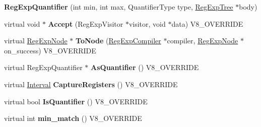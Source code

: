 \begin{DoxyCompactItemize}
\item 
\hypertarget{classv8_1_1internal_1_1_v8___f_i_n_a_l_a2d485895fb0a836c3a3dbfc3c6c30a43}{}{\bfseries Reg\+Exp\+Quantifier} (int min, int max, Quantifier\+Type type, \hyperlink{classv8_1_1internal_1_1_reg_exp_tree}{Reg\+Exp\+Tree} $\ast$body)\label{classv8_1_1internal_1_1_v8___f_i_n_a_l_a2d485895fb0a836c3a3dbfc3c6c30a43}

\item 
\hypertarget{classv8_1_1internal_1_1_v8___f_i_n_a_l_a5a421cb811caf33f244ce08fe3e5ac14}{}virtual void $\ast$ {\bfseries Accept} (Reg\+Exp\+Visitor $\ast$visitor, void $\ast$data) V8\+\_\+\+O\+V\+E\+R\+R\+I\+D\+E\label{classv8_1_1internal_1_1_v8___f_i_n_a_l_a5a421cb811caf33f244ce08fe3e5ac14}

\item 
\hypertarget{classv8_1_1internal_1_1_v8___f_i_n_a_l_aa183d4adede0c6af0c092eeebf59c194}{}virtual \hyperlink{classv8_1_1internal_1_1_reg_exp_node}{Reg\+Exp\+Node} $\ast$ {\bfseries To\+Node} (\hyperlink{classv8_1_1internal_1_1_reg_exp_compiler}{Reg\+Exp\+Compiler} $\ast$compiler, \hyperlink{classv8_1_1internal_1_1_reg_exp_node}{Reg\+Exp\+Node} $\ast$on\+\_\+success) V8\+\_\+\+O\+V\+E\+R\+R\+I\+D\+E\label{classv8_1_1internal_1_1_v8___f_i_n_a_l_aa183d4adede0c6af0c092eeebf59c194}

\item 
\hypertarget{classv8_1_1internal_1_1_v8___f_i_n_a_l_a562b1d9f75b50855b088e1a23a093cb6}{}virtual Reg\+Exp\+Quantifier $\ast$ {\bfseries As\+Quantifier} () V8\+\_\+\+O\+V\+E\+R\+R\+I\+D\+E\label{classv8_1_1internal_1_1_v8___f_i_n_a_l_a562b1d9f75b50855b088e1a23a093cb6}

\item 
\hypertarget{classv8_1_1internal_1_1_v8___f_i_n_a_l_ac1bfb16ce46192182988ae324c15decf}{}virtual \hyperlink{classv8_1_1internal_1_1_interval}{Interval} {\bfseries Capture\+Registers} () V8\+\_\+\+O\+V\+E\+R\+R\+I\+D\+E\label{classv8_1_1internal_1_1_v8___f_i_n_a_l_ac1bfb16ce46192182988ae324c15decf}

\item 
\hypertarget{classv8_1_1internal_1_1_v8___f_i_n_a_l_aeb31871865576c360f2fc4a2b54733a5}{}virtual bool {\bfseries Is\+Quantifier} () V8\+\_\+\+O\+V\+E\+R\+R\+I\+D\+E\label{classv8_1_1internal_1_1_v8___f_i_n_a_l_aeb31871865576c360f2fc4a2b54733a5}

\item 
\hypertarget{classv8_1_1internal_1_1_v8___f_i_n_a_l_ac4abdb29d336dc24ef96695ac805b1ac}{}virtual int {\bfseries min\+\_\+match} () V8\+\_\+\+O\+V\+E\+R\+R\+I\+D\+E\label{classv8_1_1internal_1_1_v8___f_i_n_a_l_ac4abdb29d336dc24ef96695ac805b1ac}


\end{DoxyCompactItemize}
